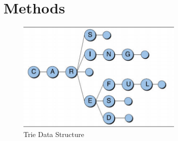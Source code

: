 \documentclass[11pt]{article}
\begin{document}
\section{Methods}
\begin{figure}[h!]
  \includegraphics[width=80mm]{imgs/trie.png}
  \caption{Trie Data Structure}
\end{figure}
\end{document}
